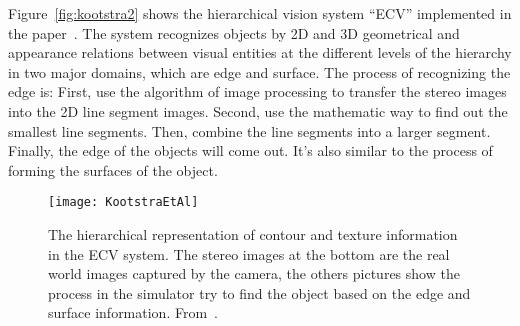 Figure~\vref{fig:kootstra2} shows the hierarchical vision system “ECV” implemented in the paper~\cite{kootstra}. The system recognizes objects by 2D and 3D geometrical and appearance relations between visual entities at the different levels of the hierarchy in two major domains, which are edge and surface. The process of recognizing the edge is: First, use the algorithm of image processing to transfer the stereo images into the 2D line segment images. Second, use the mathematic way to find out the smallest line segments. Then, combine the line segments into a larger segment. Finally, the edge of the objects will come out. It’s also similar to the process of forming the surfaces of the object. 

\begin{figure}
	\centering
	\texttt{[image: KootstraEtAl]}
	\caption{The hierarchical representation of contour and texture information in the ECV system. The stereo images at the bottom are the real world images captured by the camera, the others pictures show the process in the simulator try to find the object based on the edge and surface information. From~\cite{kootstra}.}
	\label{fig:kootstra2}
\end{figure}
